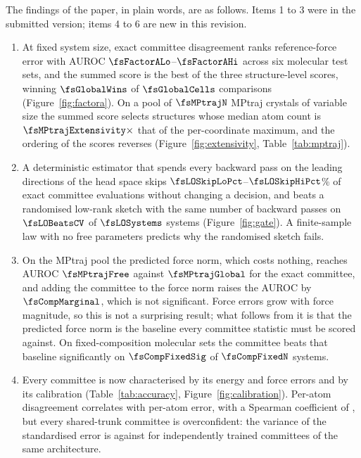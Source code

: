The findings of the paper, in plain words, are as follows. Items 1 to 3 were
in the submitted version; items 4 to 6 are new in this revision.
\begin{enumerate}
\item At fixed system size, exact committee disagreement ranks reference-force
error with AUROC $\fsFactorALo$--$\fsFactorAHi$ across six molecular test sets,
and the summed score is the best of the three structure-level scores, winning
$\fsGlobalWins$ of $\fsGlobalCells$ comparisons (Figure~\ref{fig:factora}). On
a pool of $\fsMPtrajN$ MPtraj crystals of variable size the summed score selects
structures whose median atom count is $\fsMPtrajExtensivity\times$ that of the
per-coordinate maximum, and the ordering of the scores reverses
(Figure~\ref{fig:extensivity}, Table~\ref{tab:mptraj}).
\item A deterministic estimator that spends every backward pass on the leading
directions of the head space skips $\fsLOSkipLoPct$--$\fsLOSkipHiPct$\% of
exact committee evaluations without changing a decision, and beats a randomised
low-rank sketch with the same number of backward passes on $\fsLOBeatsCV$ of
$\fsLOSystems$ systems (Figure~\ref{fig:gate}). A finite-sample law with no
free parameters predicts why the randomised sketch fails.
\item On the MPtraj pool the predicted force norm, which costs nothing, reaches
AUROC $\fsMPtrajFree$ against $\fsMPtrajGlobal$ for the exact committee, and
adding the committee to the force norm raises the AUROC by
$\fsCompMarginal$, which is not significant. Force errors grow with force
magnitude, so this is not a surprising result; what follows from it is that the
predicted force norm is the baseline every committee statistic must be scored
against. On fixed-composition molecular sets the committee beats that baseline
significantly on $\fsCompFixedSig$ of $\fsCompFixedN$ systems.
\item Every committee is now characterised by its energy and force errors and
by its calibration (Table~\ref{tab:accuracy}, Figure~\ref{fig:calibration}).
Per-atom disagreement correlates with per-atom error, with a Spearman
coefficient of , but every shared-trunk committee
is overconfident: the variance of the standardised error is
 against
 for
independently trained committees of the same architecture.

\end{enumerate}

